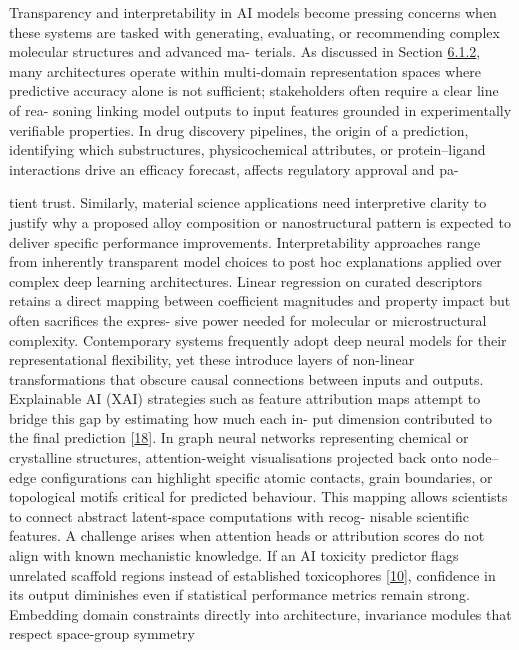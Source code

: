 \documentclass[
]{article}
\begin{document}
Transparency and interpretability in AI models become pressing concerns
when these systems are tasked with generating, evaluating, or
recommending complex molecular structures and advanced ma- terials. As
discussed in Section \hyperref[transfer-learning-across-domains]{6.1.2},
many architectures operate within multi-domain representation spaces
where predictive accuracy alone is not sufficient; stakeholders often
require a clear line of rea- soning linking model outputs to input
features grounded in experimentally verifiable properties. In drug
discovery pipelines, the origin of a prediction, identifying which
substructures, physicochemical attributes, or protein--ligand
interactions drive an efficacy forecast, affects regulatory approval and
pa-

tient trust. Similarly, material science applications need interpretive
clarity to justify why a proposed alloy composition or nanostructural
pattern is expected to deliver specific performance improvements.
Interpretability approaches range from inherently transparent model
choices to post hoc explanations applied over complex deep learning
architectures. Linear regression on curated descriptors retains a direct
mapping between coefficient magnitudes and property impact but often
sacrifices the expres- sive power needed for molecular or
microstructural complexity. Contemporary systems frequently adopt deep
neural models for their representational flexibility, yet these
introduce layers of non-linear transformations that obscure causal
connections between inputs and outputs. Explainable AI (XAI) strategies
such as feature attribution maps attempt to bridge this gap by
estimating how much each in- put dimension contributed to the final
prediction {[}\hyperref[_bookmark58]{18}{]}. In graph neural networks
representing chemical or crystalline structures, attention-weight
visualisations projected back onto node--edge configurations can
highlight specific atomic contacts, grain boundaries, or topological
motifs critical for predicted behaviour. This mapping allows scientists
to connect abstract latent-space computations with recog- nisable
scientific features. A challenge arises when attention heads or
attribution scores do not align with known mechanistic knowledge. If an
AI toxicity predictor flags unrelated scaffold regions instead of
established toxicophores {[}\hyperref[_bookmark50]{10}{]}, confidence in
its output diminishes even if statistical performance metrics remain
strong. Embedding domain constraints directly into architecture,
invariance modules that respect space-group symmetry
\end{document}
